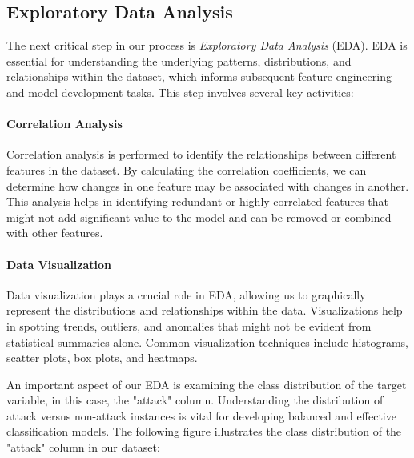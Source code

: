 \subsection{Exploratory Data Analysis}

The next critical step in our process is \textit{Exploratory Data Analysis} (EDA). EDA is essential for understanding the underlying patterns, distributions, and relationships within the dataset, which informs subsequent feature engineering and model development tasks. This step involves several key activities:

\paragraph{Correlation Analysis}
Correlation analysis is performed to identify the relationships between different features in the dataset. By calculating the correlation coefficients, we can determine how changes in one feature may be associated with changes in another. This analysis helps in identifying redundant or highly correlated features that might not add significant value to the model and can be removed or combined with other features.

\paragraph{Data Visualization}
Data visualization plays a crucial role in EDA, allowing us to graphically represent the distributions and relationships within the data. Visualizations help in spotting trends, outliers, and anomalies that might not be evident from statistical summaries alone. Common visualization techniques include histograms, scatter plots, box plots, and heatmaps.

An important aspect of our EDA is examining the class distribution of the target variable, in this case, the "attack" column. Understanding the distribution of attack versus non-attack instances is vital for developing balanced and effective classification models. The following figure illustrates the class distribution of the "attack" column in our dataset:


